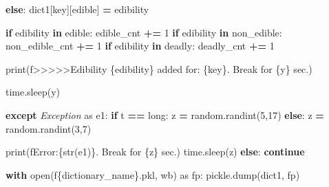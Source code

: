 \documentclass[
]{article}
\newenvironment{Shaded}{\begin{snugshade}}{\end{snugshade}}
\newcommand{\BuiltInTok}[1]{#1}
\newcommand{\ControlFlowTok}[1]{\textcolor[rgb]{0.13,0.29,0.53}{\textbf{#1}}}
\newcommand{\DecValTok}[1]{\textcolor[rgb]{0.00,0.00,0.81}{#1}}
\newcommand{\ImportTok}[1]{#1}
\newcommand{\KeywordTok}[1]{\textcolor[rgb]{0.13,0.29,0.53}{\textbf{#1}}}
\newcommand{\NormalTok}[1]{#1}
\newcommand{\OperatorTok}[1]{\textcolor[rgb]{0.81,0.36,0.00}{\textbf{#1}}}
\newcommand{\PreprocessorTok}[1]{\textcolor[rgb]{0.56,0.35,0.01}{\textit{#1}}}
\newcommand{\SpecialCharTok}[1]{\textcolor[rgb]{0.00,0.00,0.00}{#1}}
\newcommand{\SpecialStringTok}[1]{\textcolor[rgb]{0.31,0.60,0.02}{#1}}
\newcommand{\StringTok}[1]{\textcolor[rgb]{0.31,0.60,0.02}{#1}}
\begin{document}
\begin{Shaded}
\begin{Highlighting}[]
                    \ControlFlowTok{else}\NormalTok{:}
\NormalTok{                        dict1[key][}\StringTok{\textquotesingle{}edible\textquotesingle{}}\NormalTok{] }\OperatorTok{=}\NormalTok{ edibility}

                        \ControlFlowTok{if}\NormalTok{ edibility }\KeywordTok{in}\NormalTok{ edible:}
\NormalTok{                            edible\_cnt }\OperatorTok{+=} \DecValTok{1}
                        \ControlFlowTok{if}\NormalTok{ edibility }\KeywordTok{in}\NormalTok{ non\_edible:}
\NormalTok{                            non\_edible\_cnt }\OperatorTok{+=} \DecValTok{1}
                        \ControlFlowTok{if}\NormalTok{ edibility }\KeywordTok{in}\NormalTok{ deadly:}
\NormalTok{                            deadly\_cnt }\OperatorTok{+=} \DecValTok{1}

                        \BuiltInTok{print}\NormalTok{(}\SpecialStringTok{f\textquotesingle{}\textgreater{}\textgreater{}\textgreater{}\textgreater{}\textgreater{}Edibility }\SpecialCharTok{\{}\NormalTok{edibility}\SpecialCharTok{\}}\SpecialStringTok{ added for: }\SpecialCharTok{\{}\NormalTok{key}\SpecialCharTok{\}}\SpecialStringTok{. Break for }\SpecialCharTok{\{}\NormalTok{y}\SpecialCharTok{\}}\SpecialStringTok{ sec.\textquotesingle{}}\NormalTok{)}

\NormalTok{                    time.sleep(y)}

                \ControlFlowTok{except} \PreprocessorTok{Exception} \ImportTok{as}\NormalTok{ e1:}
                    \ControlFlowTok{if}\NormalTok{ t }\OperatorTok{==} \StringTok{\textquotesingle{}long\textquotesingle{}}\NormalTok{:}
\NormalTok{                        z }\OperatorTok{=}\NormalTok{ random.randint(}\DecValTok{5}\NormalTok{,}\DecValTok{17}\NormalTok{)}
                    \ControlFlowTok{else}\NormalTok{:}
\NormalTok{                        z }\OperatorTok{=}\NormalTok{ random.randint(}\DecValTok{3}\NormalTok{,}\DecValTok{7}\NormalTok{)}

                    \BuiltInTok{print}\NormalTok{(}\SpecialStringTok{f\textquotesingle{}Error:}\SpecialCharTok{\{}\BuiltInTok{str}\NormalTok{(e1)}\SpecialCharTok{\}}\SpecialStringTok{. Break for }\SpecialCharTok{\{}\NormalTok{z}\SpecialCharTok{\}}\SpecialStringTok{ sec.\textquotesingle{}}\NormalTok{)}
\NormalTok{                    time.sleep(z)}
            \ControlFlowTok{else}\NormalTok{:}
                \ControlFlowTok{continue}

        \ControlFlowTok{with} \BuiltInTok{open}\NormalTok{(}\SpecialStringTok{f\textquotesingle{}}\SpecialCharTok{\{}\NormalTok{dictionary\_name}\SpecialCharTok{\}}\SpecialStringTok{.pkl\textquotesingle{}}\NormalTok{, }\StringTok{\textquotesingle{}wb\textquotesingle{}}\NormalTok{) }\ImportTok{as}\NormalTok{ fp:}
\NormalTok{            pickle.dump(dict1, fp)}


\end{Highlighting}
\end{Shaded}
\end{document}
